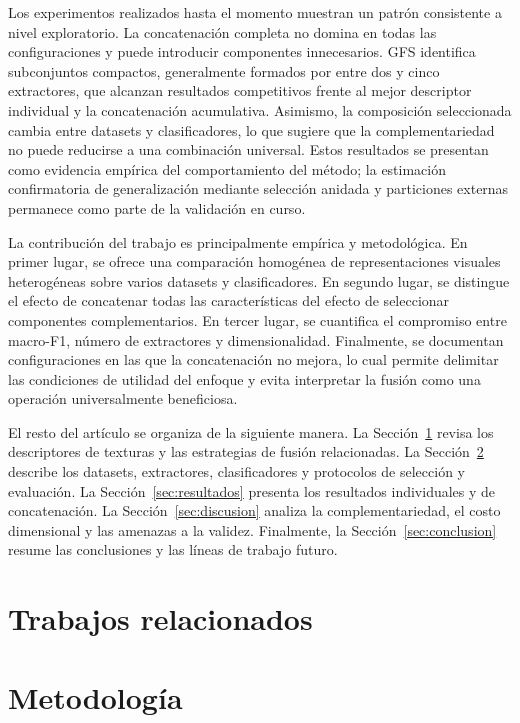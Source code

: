 \documentclass[a4paper,fleqn]{cas-sc}
\begin{document}
Los experimentos realizados hasta el momento muestran un patrón consistente a nivel exploratorio. La concatenación completa no domina en todas las configuraciones y puede introducir componentes innecesarios. GFS identifica subconjuntos compactos, generalmente formados por entre dos y cinco extractores, que alcanzan resultados competitivos frente al mejor descriptor individual y la concatenación acumulativa. Asimismo, la composición seleccionada cambia entre datasets y clasificadores, lo que sugiere que la complementariedad no puede reducirse a una combinación universal. Estos resultados se presentan como evidencia empírica del comportamiento del método; la estimación confirmatoria de generalización mediante selección anidada y particiones externas permanece como parte de la validación en curso.

La contribución del trabajo es principalmente empírica y metodológica. En primer lugar, se ofrece una comparación homogénea de representaciones visuales heterogéneas sobre varios datasets y clasificadores. En segundo lugar, se distingue el efecto de concatenar todas las características del efecto de seleccionar componentes complementarios. En tercer lugar, se cuantifica el compromiso entre macro-F1, número de extractores y dimensionalidad. Finalmente, se documentan configuraciones en las que la concatenación no mejora, lo cual permite delimitar las condiciones de utilidad del enfoque y evita interpretar la fusión como una operación universalmente beneficiosa.

El resto del artículo se organiza de la siguiente manera. La Sección~\ref{sec:trabajos} revisa los descriptores de texturas y las estrategias de fusión relacionadas. La Sección~\ref{sec:metodologia} describe los datasets, extractores, clasificadores y protocolos de selección y evaluación. La Sección~\ref{sec:resultados} presenta los resultados individuales y de concatenación. La Sección~\ref{sec:discusion} analiza la complementariedad, el costo dimensional y las amenazas a la validez. Finalmente, la Sección~\ref{sec:conclusion} resume las conclusiones y las líneas de trabajo futuro.

\section{Trabajos relacionados}\label{sec:trabajos}

\section{Metodología}\label{sec:metodologia}
\end{document}

